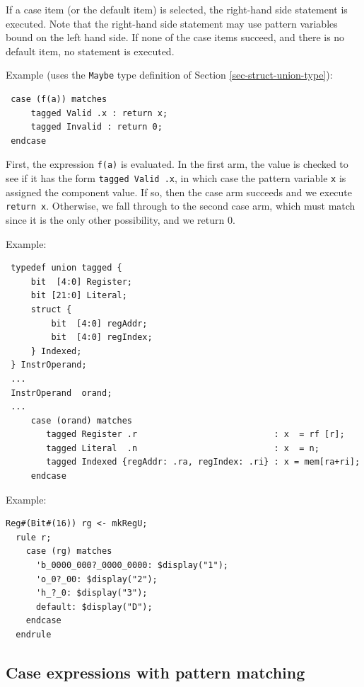 \documentclass[twoside,letterpaper]{article}
\begin{document}
If a case item (or the default item) is selected, the right-hand side
statement is executed.  Note that the right-hand side statement may
use pattern variables bound on the left hand side.  If none of the
case items succeed, and there is no default item, no statement is
executed.

Example (uses the \texttt{Maybe} type definition of Section
{\ref{sec-struct-union-type}}):
\begin{verbatim}
 case (f(a)) matches
     tagged Valid .x : return x;
     tagged Invalid : return 0;
 endcase
\end{verbatim}
First, the expression \texttt{f(a)} is evaluated.  In the first arm, the
value is checked to see if it has the form {\mbox{\texttt{tagged Valid
.x}}}, in which case the pattern variable \texttt{x} is assigned the
component value.  If so, then the case arm succeeds and we execute
\texttt{return~x}.  Otherwise, we fall through to the second case arm,
which must match since it is the only other possibility, and we return
0.

Example:
\begin{verbatim}
 typedef union tagged {
     bit  [4:0] Register;
     bit [21:0] Literal;
     struct {
         bit  [4:0] regAddr;
         bit  [4:0] regIndex;
     } Indexed;
 } InstrOperand;
 ...
 InstrOperand  orand;
 ...
     case (orand) matches
        tagged Register .r                           : x  = rf [r];
        tagged Literal  .n                           : x  = n;
        tagged Indexed {regAddr: .ra, regIndex: .ri} : x = mem[ra+ri];
     endcase
\end{verbatim}

Example:
\begin{verbatim}
Reg#(Bit#(16)) rg <- mkRegU;
  rule r;
    case (rg) matches
      'b_0000_000?_0000_0000: $display("1");
      'o_0?_00: $display("2");
      'h_?_0: $display("3");
      default: $display("D");
    endcase
  endrule
\end{verbatim}



\subsection{Case expressions with pattern matching}
\end{document}
